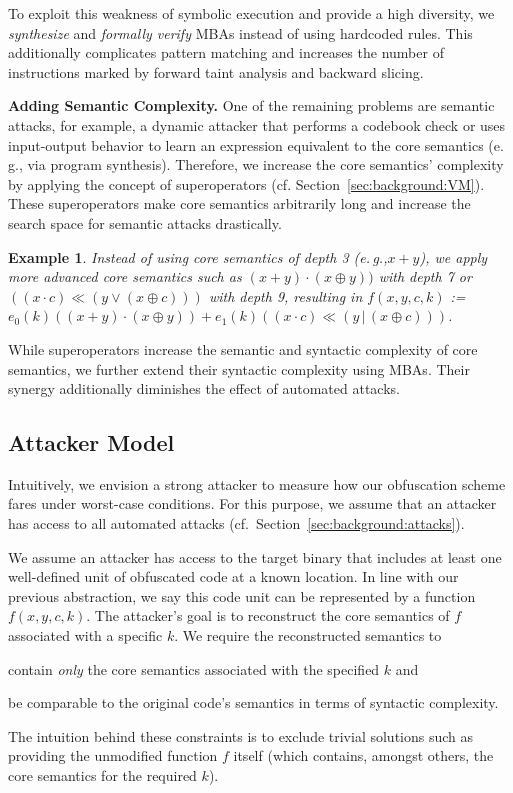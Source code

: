 \documentclass[letterpaper,twocolumn,10pt]{article}
\newcommand{\eg}{e.\,g.,\xspace}
\newcommand{\cf}{cf.\xspace}
\theoremstyle{customexample}
\newtheorem{example}{Example}
\theoremstyle{customexperiment}
\begin{document}
To exploit this weakness of symbolic execution and provide a high diversity, we \emph{synthesize} and \emph{formally verify} MBAs instead of using hardcoded rules. This additionally complicates pattern matching and increases the number of instructions marked by forward taint analysis and backward slicing.



\textbf{Adding Semantic Complexity.}
One of the remaining problems are semantic attacks, for example, a dynamic attacker that performs a codebook check or uses input-output behavior to learn an expression equivalent to the core semantics (\eg via program synthesis). Therefore, we increase the core semantics' complexity by applying the concept of superoperators (\cf Section~\ref{sec:background:VM}). These superoperators make core semantics arbitrarily long and increase the search space for semantic attacks drastically.

\begin{example}
Instead of using core semantics of depth 3 (\eg $x + y$), we apply more advanced core semantics such as $(x + y) \cdot (x\oplus y))$ with depth 7 or $((x \cdot c) \ll (y \lor (x \oplus c)))$ with depth 9, resulting in $f(x ,y ,c, k)$ := $e_0(k)((x + y) \cdot (x \oplus y)) + e_1(k)((x \cdot c) \ll (y\,|\,(x \oplus c)))$.
\end{example}
While superoperators increase the semantic and syntactic complexity of core semantics, we further extend their syntactic complexity using MBAs. Their synergy additionally diminishes the effect of automated attacks.



\subsection{Attacker Model}\label{sec:threat_model}
Intuitively, we envision a strong attacker to measure how our obfuscation scheme fares under worst-case conditions. For this purpose, we assume that an attacker has access to all automated attacks (\cf~Section~\ref{sec:background:attacks}).

We assume an attacker has access to the target binary that includes at least one well-defined unit of obfuscated code at a known location. 
In line with our previous abstraction, we say this code unit can be represented by a function $f(x, y, c, k)$. 
The attacker's goal is to reconstruct the core semantics of $f$ associated with a specific $k$.  We require the reconstructed semantics to
\begin{inparaenum}[(1)]
\item contain \emph{only} the core semantics associated with the specified $k$ and \item be comparable to the original code's semantics in terms of syntactic complexity. \end{inparaenum}The intuition behind these constraints is to exclude trivial solutions such as providing the unmodified function $f$ itself (which contains, amongst others, the core semantics for the required $k$).
\end{document}
